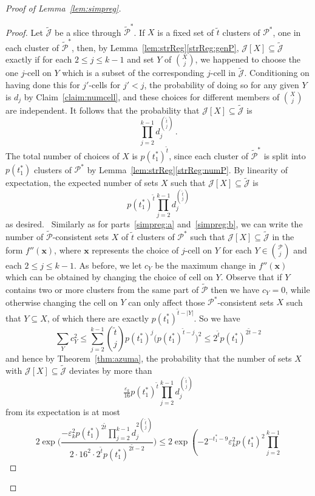\documentclass[12pt,a4paper]{amsart}
\let\eps\varepsilon
\newcommand{\oldqed}{}
\def\endofClaim{\hfill\scalebox{.6}{$\Box$}}
\newenvironment{claimproof}[1][Proof]{
  \renewcommand{\oldqed}{\qedsymbol}
  \renewcommand{\qedsymbol}{\endofClaim}
  \begin{proof}[#1]
}{
  \end{proof}
  \renewcommand{\qedsymbol}{\oldqed}
}
\newcommand{\cJ}{\mathcal{J}}
\newcommand{\Part}{\mathcal{P}}
\begin{document}
\begin{proof}[Proof of Lemma~\ref{lem:simpreg}]
\begin{claimproof}
  Let $\tilde{\cJ}$ be a slice through $\tilde{\Part}^*$. If $X$ is a fixed set of $\tilde{t}$
  clusters of $\Part^*$, one in each cluster of $\tilde{\Part}^*$, then, by Lemma~\ref{lem:strReg}\ref{strReg:genP},
  $\cJ[X]\subseteq \tilde{\cJ}$ exactly if for each $2\le j\le k-1$ and
  set $Y$ of $\binom{X}{j}$, we happened to choose the one $j$-cell on $Y$ which
  is a subset of the corresponding $j$-cell in $\tilde{\cJ}$. Conditioning on having
  done this for $j'$-cells for $j'<j$, the probability of doing so for any given
  $Y$ is $d_j$ by Claim~\ref{claim:numcell}, and these choices for different members of $\binom{X}{j}$ are
  independent. It follows that the probability that $\cJ[X]\subseteq\tilde{\cJ}$ is
  \[\prod_{j=2}^{k-1}d_j^{\binom{\tilde{t}}{j}}\,.\]
  The total number of choices of $X$ is $p(t_1^*)^{\tilde{t}}$, since
  each cluster of $\tilde{\Part}^*$ is split into $p(t_1^*)$ clusters of
  $\Part^*$ by Lemma~\ref{lem:strReg}\ref{strReg:numP}. By linearity of expectation, the expected number of sets $X$ such
  that $\cJ[X]\subseteq\tilde{\cJ}$ is
  \[p(t_1^*)^{\tilde{t}}\prod_{j=2}^{k-1}d_j^{\binom{\tilde{t}}{j}}\]
  as desired.
  \
  Similarly as for parts~\ref{simpreg:a} and~\ref{simpreg:b}, we can write the number of $\tilde{\Part}$-consistent sets $X$ of $\tilde{t}$ clusters of $\Part^*$ such that $\cJ[X]\subseteq \tilde{\cJ}$ in the form $f''(\mathbf{x})$, where $\mathbf{x}$ represents the choice of $j$-cell on $Y$ for each $Y\in\binom{\Part}{j}$ and each $2\le j\le k-1$. As before, we let $c_Y$ be the maximum change in $f''(\mathbf{x})$ which can be obtained by changing the choice of cell on $Y$. Observe that if $Y$ contains two or more clusters from the same part of $\tilde{\Part}$ then we have $c_Y=0$, while otherwise changing the cell on $Y$ can only affect those $\Part^*$-consistent sets $X$ such that
  $Y\subseteq X$, of which there are exactly $p(t_1^*)^{\tilde{t}-|Y|}$. So we have
  \[\sum_{Y}c_Y^2\le \sum_{j=2}^{k-1}\binom{\tilde{t}}{j}p(t_1^*)^j\big(p(t_1^*)^{\tilde{t}-j}\big)^2\le
  2^{\tilde{t}}p(t_1^*)^{2\tilde{t}-2}\]
  and hence by Theorem~\ref{thm:azuma}, the probability that the number of sets $X$ with
  $\cJ[X]\subseteq\tilde{\cJ}$ deviates by more than
  \[\tfrac{\eps_k}{16}
  p(t_1^*)^{\tilde{t}}\prod_{j=2}^{k-1}d_j^{\binom{\tilde{t}}{j}}\]
  from its expectation is at most
  \[2\exp\Big(\frac{-\eps_k^2
  p(t_1^*)^{2\tilde{t}}\prod_{j=2}^{k-1}d_j^{2\binom{\tilde{t}}{j}}}{2\cdot
  16^2\cdot 
  2^{\tilde{t}}p(t_1^*)^{2\tilde{t}-2}}\Big)
  \leq
  2\exp\left(-2^{-t_1^*-9}\eps_k^2p(t_1^*)^2\prod_{j=2}^{k-1} 
\]
\end{claimproof}
\end{proof}
\end{document}
